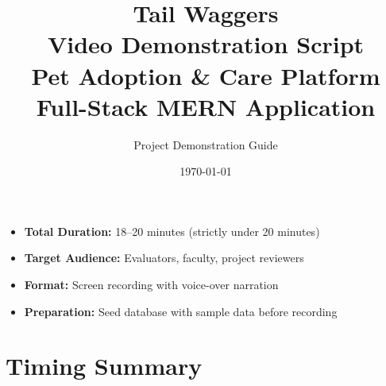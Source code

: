 \documentclass[12pt,a4paper]{article}
\title{
  \vspace{-1cm}
  {\LARGE\bfseries Tail Waggers}\\[0.3cm]
  {\Large Video Demonstration Script}\\[0.2cm]
  {\large Pet Adoption \& Care Platform}\\[0.4cm]
  {\normalsize Full-Stack MERN Application}
}
\author{Project Demonstration Guide}
\date{\today}
\begin{document}
\maketitle
\thispagestyle{empty}

\vspace{1cm}
\begin{tcolorbox}[colback=blue!5, colframe=blue!40!black, title=\textbf{Script Overview}]
\begin{itemize}[nosep]
  \item \textbf{Total Duration:} 18--20 minutes (strictly under 20 minutes)
  \item \textbf{Target Audience:} Evaluators, faculty, project reviewers
  \item \textbf{Format:} Screen recording with voice-over narration
  \item \textbf{Preparation:} Seed database with sample data before recording
\end{itemize}
\end{tcolorbox}

\newpage
\tableofcontents
\newpage

\section{Timing Summary}
\end{document}
